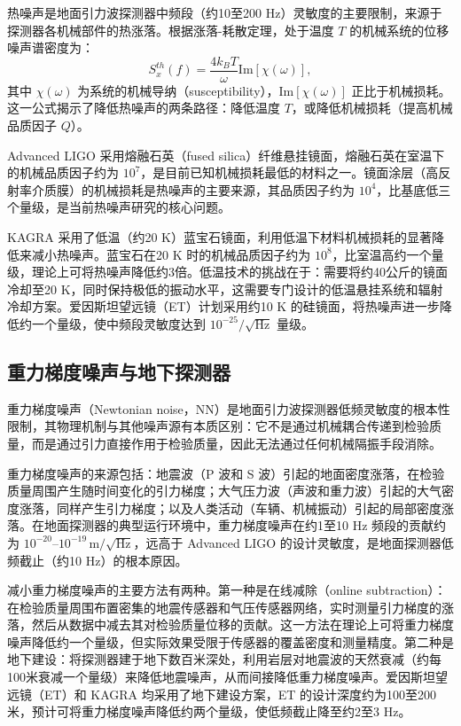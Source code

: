 热噪声是地面引力波探测器中频段（约10至200 Hz）灵敏度的主要限制，来源于探测器各机械部件的热涨落。根据涨落-耗散定理，处于温度 $T$ 的机械系统的位移噪声谱密度为：
\begin{equation}
  S_x^{th}(f) = \frac{4k_B T}{\omega} \text{Im}[\chi(\omega)],
\end{equation}
其中 $\chi(\omega)$ 为系统的机械导纳（susceptibility），$\text{Im}[\chi(\omega)]$ 正比于机械损耗。这一公式揭示了降低热噪声的两条路径：降低温度 $T$，或降低机械损耗（提高机械品质因子 $Q$）。

Advanced LIGO 采用熔融石英（fused silica）纤维悬挂镜面，熔融石英在室温下的机械品质因子约为 $10^7$，是目前已知机械损耗最低的材料之一。镜面涂层（高反射率介质膜）的机械损耗是热噪声的主要来源，其品质因子约为 $10^4$，比基底低三个量级，是当前热噪声研究的核心问题。

KAGRA 采用了低温（约20 K）蓝宝石镜面，利用低温下材料机械损耗的显著降低来减小热噪声。蓝宝石在20 K 时的机械品质因子约为 $10^8$，比室温高约一个量级，理论上可将热噪声降低约3倍。低温技术的挑战在于：需要将约40公斤的镜面冷却至20 K，同时保持极低的振动水平，这需要专门设计的低温悬挂系统和辐射冷却方案。爱因斯坦望远镜（ET）计划采用约10 K 的硅镜面，将热噪声进一步降低约一个量级，使中频段灵敏度达到 $10^{-25}/\sqrt{\text{Hz}}$ 量级。

\subsection{重力梯度噪声与地下探测器}

重力梯度噪声（Newtonian noise，NN）是地面引力波探测器低频灵敏度的根本性限制，其物理机制与其他噪声源有本质区别：它不是通过机械耦合传递到检验质量，而是通过引力直接作用于检验质量，因此无法通过任何机械隔振手段消除。

重力梯度噪声的来源包括：地震波（P 波和 S 波）引起的地面密度涨落，在检验质量周围产生随时间变化的引力梯度；大气压力波（声波和重力波）引起的大气密度涨落，同样产生引力梯度；以及人类活动（车辆、机械振动）引起的局部密度涨落。在地面探测器的典型运行环境中，重力梯度噪声在约1至10 Hz 频段的贡献约为 $10^{-20}$--$10^{-19}\,\text{m}/\sqrt{\text{Hz}}$，远高于 Advanced LIGO 的设计灵敏度，是地面探测器低频截止（约10 Hz）的根本原因。

减小重力梯度噪声的主要方法有两种。第一种是在线减除（online subtraction）：在检验质量周围布置密集的地震传感器和气压传感器网络，实时测量引力梯度的涨落，然后从数据中减去其对检验质量位移的贡献。这一方法在理论上可将重力梯度噪声降低约一个量级，但实际效果受限于传感器的覆盖密度和测量精度。第二种是地下建设：将探测器建于地下数百米深处，利用岩层对地震波的天然衰减（约每100米衰减一个量级）来降低地震噪声，从而间接降低重力梯度噪声。爱因斯坦望远镜（ET）和 KAGRA 均采用了地下建设方案，ET 的设计深度约为100至200米，预计可将重力梯度噪声降低约两个量级，使低频截止降至约2至3 Hz。

